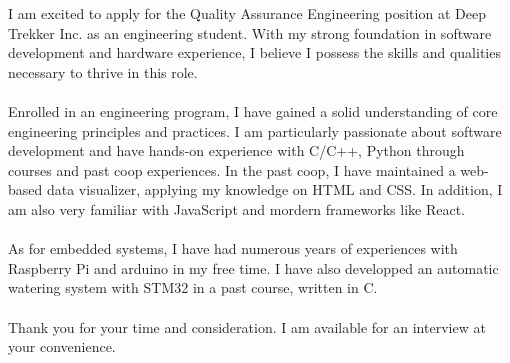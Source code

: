 \documentclass[11pt, a4paper]{awesome-cv}
\begin{document}
\makecvheader[R]

\makecvfooter
  {}
  {}
  {}

\makelettertitle

\begin{cvletter}

I am excited to apply for the Quality Assurance Engineering position at Deep Trekker Inc. as an engineering student. With my strong foundation in software development and hardware experience, I believe I possess the skills and qualities necessary to thrive in this role. \\\\Enrolled in an engineering program, I have gained a solid understanding of core engineering principles and practices. I am particularly passionate about software development and have hands-on experience with C/C++, Python through courses and past coop experiences. In the past coop, I have maintained a web-based data visualizer, applying my knowledge on HTML and CSS. In addition, I am also very familiar with JavaScript and mordern frameworks like React. \\\\As for embedded systems, I have had numerous years of experiences with Raspberry Pi and arduino in my free time. I have also developped an automatic watering system with STM32 in a past course, written in C. \\\\Thank you for your time and consideration. I am available for an interview at your convenience.





\end{cvletter}


\makeletterclosing
\end{document}
